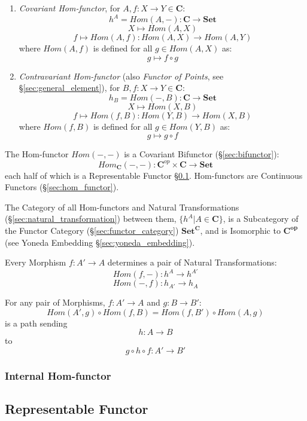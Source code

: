 \begin{enumerate}
  \item \emph{Covariant Hom-functor}, for $A,f : X \rightarrow Y \in
    \mathbf{C}$:
\[
  h^A = Hom(A,-) : \mathbf{C} \rightarrow \mathbf{Set}
\]\[
  X \mapsto Hom(A,X)
\]\[
  f \mapsto Hom(A,f) : Hom(A,X) \rightarrow Hom(A,Y)
\]
  where $Hom(A,f)$ is defined for all $g \in Hom(A,X)$ as:
\[
  g \mapsto f \circ g
\]

  \item \emph{Contravariant Hom-functor} (also \emph{Functor of
    Points}, see \S\ref{sec:general_element}), for $B,f : X
    \rightarrow Y \in \mathbf{C}$:
\[
  h_B = Hom(-,B) : \mathbf{C} \rightarrow \mathbf{Set}
\]\[
  X \mapsto Hom(X,B)
\]\[
  f \mapsto Hom(f,B) : Hom(Y,B) \rightarrow Hom(X,B)
\]
  where $Hom(f,B)$ is defined for all $g \in Hom(Y,B)$ as:
\[
  g \mapsto g \circ f
\]
\end{enumerate}
The Hom-functor $Hom(-,-)$ is a Covariant Bifunctor
(\S\ref{sec:bifunctor}):
\[
  Hom_\mathbf{C}(-,-):
    \mathbf{C}^{op} \times \mathbf{C} \rightarrow \mathbf{Set}
\]
each half of which is a Representable Functor
\S\ref{sec:representable_functor}. Hom-functors are Continuous
Functors (\S\ref{sec:hom_functor}).

The Category of all Hom-functors and Natural Transformations
(\S\ref{sec:natural_transformation}) between them, $\{ h^A | A \in
\mathbf{C} \}$, is a Subcategory of the Functor Category
(\S\ref{sec:functor_category}) $\mathbf{Set^C}$, and is Isomorphic to
$\mathbf{C^{op}}$ (see Yoneda Embedding \S\ref{sec:yoneda_embedding}).

Every Morphism $f : A' \rightarrow A$ determines a pair of Natural
Transformations:
\[
  Hom(f,-) : h^A \rightarrow h^{A'}
\]\[
  Hom(-,f) : h_{A'} \rightarrow h_A
\]

For any pair of Morphisms, $f : A' \rightarrow A$ and $g : B
\rightarrow B'$:
\[
  Hom(A',g) \circ Hom(f,B) = Hom(f,B') \circ Hom(A,g)
\]
is a path sending
\[
  h : A \rightarrow B
\]
to
\[
  g \circ h \circ f : A' \rightarrow B'
\]



\subsubsection{Internal Hom-functor}\label{sec:internal_homfunctor}



\subsection{Representable Functor}\label{sec:representable_functor}

